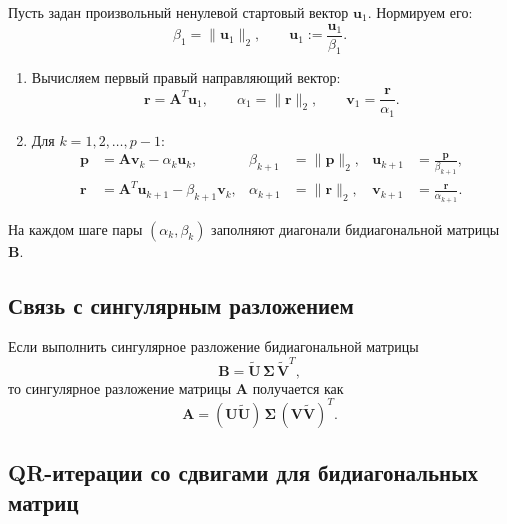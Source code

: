\documentclass[12pt]{article}
\begin{document}
	
	Пусть задан произвольный ненулевой стартовый вектор $\mathbf{u}_{1}$.
	Нормируем его:
	\begin{equation}
	\beta_{1} = \|\mathbf{u}_{1}\|_{2},
	\qquad
	\mathbf{u}_{1} := \frac{\mathbf{u}_{1}}{\beta_{1}}.
	\end{equation}
	
	\begin{enumerate}
		\item Вычисляем первый правый направляющий вектор:
		\begin{equation}
		\mathbf{r} = \mathbf{A}^{T}\mathbf{u}_{1},
		\qquad
		\alpha_{1} = \|\mathbf{r}\|_{2},
		\qquad
		\mathbf{v}_{1} = \frac{\mathbf{r}}{\alpha_{1}}.
	\end{equation}
		
		\item Для $k = 1,2,\ldots,p-1$:
		\begin{align*}
			\mathbf{p} &= \mathbf{A}\mathbf{v}_{k} - \alpha_{k} \mathbf{u}_{k}, 
			&
			\beta_{k+1} &= \|\mathbf{p}\|_{2},
			&
			\mathbf{u}_{k+1} &= \frac{\mathbf{p}}{\beta_{k+1}},
			\\
			\mathbf{r} &= \mathbf{A}^{T}\mathbf{u}_{k+1} - \beta_{k+1}\mathbf{v}_{k},
			&
			\alpha_{k+1} &= \|\mathbf{r}\|_{2},
			&
			\mathbf{v}_{k+1} &= \frac{\mathbf{r}}{\alpha_{k+1}}.
		\end{align*}
	\end{enumerate}
	
	На каждом шаге пары $(\alpha_{k}, \beta_{k})$ заполняют диагонали бидиагональной матрицы $\mathbf{B}$.
	
	\subsection*{Связь с сингулярным разложением}
	
	Если выполнить сингулярное разложение бидиагональной матрицы
	\begin{equation}
	\mathbf{B} = \widetilde{\mathbf{U}}\,\boldsymbol{\Sigma}\,\widetilde{\mathbf{V}}^{T},
\end{equation}
	то сингулярное разложение матрицы $\mathbf{A}$ получается как
	\begin{equation}
	\mathbf{A}
	= (\mathbf{U}\widetilde{\mathbf{U}})\,\boldsymbol{\Sigma}\,(\mathbf{V}\widetilde{\mathbf{V}})^{T}.\label{fm22}
\end{equation}
	
	\subsection*{QR-итерации со сдвигами для бидиагональных матриц}
	
\end{document}
